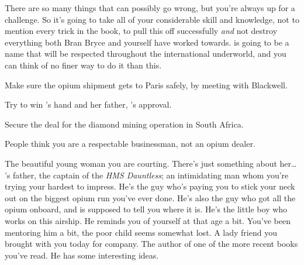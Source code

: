 \documentclass[char]{airship}
\begin{document}
There are so many things that can possibly go wrong, but you're always
up for a challenge.  So it's going to take all of your considerable
skill and knowledge, not to mention every trick in the book, to pull
this off successfully {\em and} not destroy everything both Bran Bryce
and yourself have worked towards.  {\cDealer{}} is going to be a name
that will be respected throughout the international underworld, and
you can think of no finer way to do it than this.

\begin{itemz}[Goals]
  \item Make sure the opium shipment gets to Paris safely, by meeting with Blackwell.
  \item Try to win {\cThief{}}'s hand and her father, {\cCaptain{}}'s approval.
  \item Secure the deal for the diamond mining operation in South Africa.
\end{itemz}

\begin{itemz}[Notes]
  \item People think you are a respectable businessman, not an opium dealer.
\end{itemz}


\begin{contacts}
  \contact{\cThief{}} The beautiful young woman you are courting.  There's just something about her{\ldots}
  \contact{\cCaptain{}} \cThief{}'s father, the captain of the {\it HMS Dauntless}; an intimidating man whom you're trying your hardest to impress.
  \contact{\cBoddy{}} He's the guy who's paying you to stick your neck out on the biggest opium run you've ever done.  He's also the guy who got all the opium onboard, and is supposed to tell you where it is.
  \contact{\cRobot{}} He's the little boy who works on this airship.  He reminds you of yourself at that age a bit. You've been mentoring him a bit, the poor child seems somewhat lost.
  \contact{\cNPCWhore{}} A lady friend you brought with you today for company.
  \contact{\cSaboteur{}} The author of one of the more recent books you've read.  He has some interesting ideas.
\end{contacts}
\end{document}
